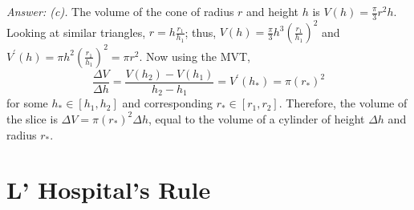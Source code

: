 \documentclass[12pt]{article}
\begin{document}
\begin{enumerate}
{\it Answer: (c).} The volume of the cone of radius $r$ and height $h$ is $\displaystyle{V(h)=\frac{\pi}{3}r^2 h}$. Looking at similar triangles,
$\displaystyle{r=h\frac{r_1}{h_1}}$; thus, $\displaystyle{V(h)=\frac{\pi}{3}h^3\left(\frac{r_1}{h_1}\right)^2}$ and $\displaystyle{V^{\prime}(h)=\pi h^2\left(\frac{r_1}{h_1}\right)^2 =\pi r^2}$.
Now using the MVT,
$$\frac{\Delta V}{\Delta h}=\frac{V(h_2)-V(h_1)}{h_2-h_1}=V^{\prime}(h_*)=\pi(r_*)^2$$ 
for some $h_* \in [h_1, h_2]$ and corresponding $r_* \in [r_1, r_2]$. Therefore, the volume of the slice is 
$\Delta V=\pi (r_*)^2 \Delta h$, equal to the volume of a cylinder of height $\Delta h$ and radius $r_*$.

\end{enumerate}

\pagebreak
\section{L' Hospital's Rule}
\end{document}
